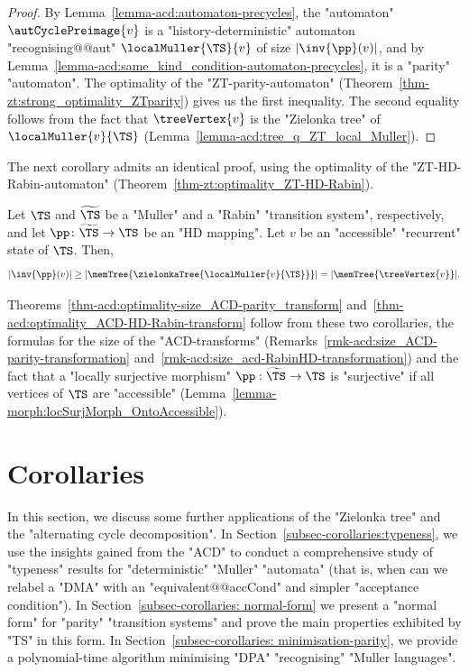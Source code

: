 \documentclass[10pt,a4paper]{amsart}
\begin{document}
\begin{proof}
	By Lemma~\ref{lemma-acd:automaton-precycles}, the "automaton" $\autCyclePreimage{v}$ is a "history-deterministic" automaton "recognising@@aut" $\localMuller{\TS}{v}$ of size $|\inv{\pp}(v)|$, and by Lemma~\ref{lemma-acd:same_kind_condition-automaton-precycles}, it is a "parity" "automaton". The optimality of the "ZT-parity-automaton" (Theorem~\ref{thm-zt:strong_optimality_ZTparity}) gives us the first inequality. The second equality follows from the fact that $\treeVertex{v}$ is the "Zielonka tree" of $\localMuller{v}{\TS}$ (Lemma~\ref{lemma-acd:tree_q_ZT_local_Muller}).
\end{proof}

The next corollary admits an identical proof, using the optimality of the "ZT-HD-Rabin-automaton" (Theorem~\ref{thm-zt:optimality_ZT-HD-Rabin}).
\begin{corollary}
	Let $\TS$ and $\widetilde{\TS}$ be a "Muller" and a "Rabin" "transition system", respectively, and let $\pp \colon \widetilde{\TS} \to \TS$ be an "HD mapping". Let $v$ be an "accessible" "recurrent" state of $\TS$. Then,
	\[ |\inv{\pp}(v)| \geq |\memTree{\zielonkaTree{\localMuller{v}{\TS}}}| = |\memTree{\treeVertex{v}}|.\]
\end{corollary}

Theorems~\ref{thm-acd:optimality-size_ACD-parity_transform} and~\ref{thm-acd:optimality_ACD-HD-Rabin-transform} follow from these two corollaries, the formulas for the size of the "ACD-transforms" (Remarks~\ref{rmk-acd:size_ACD-parity-transformation} and~\ref{rmk-acd:size_acd-RabinHD-transformation}) and the fact that a "locally surjective morphism" $\pp:\widetilde{\TS} \to \TS$  is "surjective" if all vertices of $\TS$ are "accessible" (Lemma~\ref{lemma-morph:locSurjMorph_OntoAccessible}).


 	

	\section{Corollaries}\label{section:corollaries}
	In this section, we discuss some further applications of the "Zielonka tree" and the "alternating cycle decomposition".
In Section~\ref{subsec-corollaries:typeness}, we use the insights gained from the "ACD" to conduct a comprehensive study of "typeness" results for "deterministic" "Muller" "automata" (that is, when can we relabel a "DMA" with an "equivalent@@accCond" and simpler "acceptance condition").
In Section~\ref{subsec-corollaries: normal-form} we present a "normal form" for "parity" "transition systems" and prove the main properties exhibited by "TS" in this form.
In Section~\ref{subsec-corollaries: minimisation-parity}, we provide a polynomial-time algorithm minimising "DPA" "recognising" "Muller languages".
\end{document}
